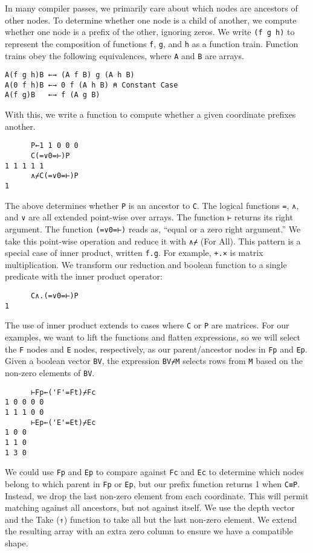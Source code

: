 \documentclass[numbers,preprint]{sigplanconf}
\begin{document}
\noindent
In many compiler passes, we primarily care about which nodes are ancestors 
of other nodes. To determine whether one node is a child of another, we compute 
whether one node is a prefix of the other, ignoring zeros.
We write \verb;(f g h); to represent the composition of functions \verb;f;, \verb;g;,
and \verb;h; as a function train.
Function trains obey the following equivalences, where \verb;A; and \verb;B;
are arrays.

\begin{verbatim}
A(f g h)B ←→ (A f B) g (A h B)
A(0 f h)B ←→ 0 f (A h B) ⍝ Constant Case
A(f g)B   ←→ f (A g B)
\end{verbatim}

\noindent
With this, we write a function to compute whether a given coordinate prefixes 
another.

\begin{verbatim}
      P←1 1 0 0 0
      C(=∨0=⊢)P
1 1 1 1 1
      ∧⌿C(=∨0=⊢)P
1
\end{verbatim}

\noindent
The above determines whether \verb;P; is an ancestor to \verb;C;.
The logical functions \verb;=;, \verb;∧;, and \verb;∨; are all extended 
point-wise over arrays.
The function \verb;⊢; returns its right argument.
The function \verb;(=∨0=⊢); reads as, ``equal or a zero right argument.'' 
We take this point-wise operation and reduce it with \verb;∧⌿; (For All).
This pattern is a special case of inner product, written \verb;f.g;. 
For example, \verb;+.×; is matrix multiplication. We transform our reduction and 
boolean function to a single predicate with the inner product operator:
\begin{verbatim}
      C∧.(=∨0=⊢)P
1
\end{verbatim}

The use of inner product extends to cases where \verb;C; or \verb;P; are matrices.
For our examples, we want to lift the functions and flatten expressions, so we 
will select the \verb;F; nodes and \verb;E; nodes, respectively, as our 
parent/ancestor nodes in \verb;Fp; and \verb;Ep;. Given a boolean vector 
\verb;BV;, the expression \verb;BV⌿M; selects rows from \verb;M; based on the 
non-zero elements of \verb;BV;.

\begin{verbatim}
      ⊢Fp←('F'=Ft)⌿Fc
1 0 0 0 0
1 1 1 0 0
      ⊢Ep←('E'=Et)⌿Ec
1 0 0
1 1 0
1 3 0
\end{verbatim}

\noindent
We could use \verb;Fp; and \verb;Ep; to compare against \verb;Fc; and \verb;Ec;
to determine which nodes belong to which parent in \verb;Fp; or \verb;Ep;, 
but our prefix function returns 1 when \verb;C≡P;. 
Instead, we drop the last non-zero element from each coordinate.
This will permit matching against all ancestors, but not against itself.
We use the depth vector and the Take (\verb;↑;) function to take all but
the last non-zero element. We extend the resulting array with an extra 
zero column to ensure we have a compatible shape.
\end{document}
